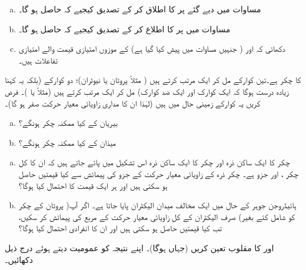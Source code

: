 \begin{enumerate}[a.]
\item
مساوات  میں دیے گئے  پر  کا اطلاق کر کے تصدیق کیجیے
 کہ  حاصل ہو گا۔
\item
مساوات  میں  پر  کا اطلاع کر کے تصدیق کیجیے کہ  حاصل ہو گا۔
\item
دکھائی کہ  اور  ( جنہیں مساوات  میں پیش کیا گیا ہے)  کے موزوں امتیازی قیمت والے امتیازی تفاعلات ہیں۔ 
\end{enumerate}
 کا چکر  ہے۔تین کوارکے مل کر ایک  مرتب کرتے ہیں ( مثلاً پروٹان یا نیوٹران)؛ دو کوارکے (بلکہ یہ کہنا زیادہ درست ہوگا کہ ایک کوارک اور ایک ضد کوارک) مل کر ایک  مرتب کرتے ہیں (مثلاً  یا )۔ فرض کریں یہ کوارکے زمینی حال میں ہیں (لہٰذا ان کا مداری زاویائی معیار حرکت صفر ہو گا)۔ 
\begin{enumerate}[a.]
\item
بیریان کے کیا ممکنہ چکر ہونگے؟ 
\item
میذان کے کیا ممکنہ چکر ہونگے؟ 
\end{enumerate}
\begin{enumerate}[a.]
\item
چکر  کا ایک ساکن ذرہ اور چکر  کا ایک ساکن ذرہ اس تشکیل میں پائے جاتے ہیں کہ ان کا کل چکر ، اور  جزو  ہے۔ چکر  ذرہ کے زاویائی معیار حرکت کے  جزو کی پیمائش سے کیا قیمتیں حاصل ہو سکتی ہیں اور ہر ایک قیمت کا احتمال کیا ہوگا؟ 
\item
ہائیڈروجن جوہر کے حال  میں ایک مخالف میدان الیکٹران پایا جاتا ہے۔ اگر آپ( پروٹان کے چکر کو شامل کئے بغیر) صرف الیکٹران کے کل زاویائی معیار حرکت کے مربع کی پیمائش کر سکیں، تب کیا قیمتیں حاصل ہو سکتی ہیں اور ان کا انفرادی احتمال کیا ہوگا؟ 
\end{enumerate}
 اور  کا مقلوب تعین کریں (جہاں  ہوگا)۔ اپنے نتیجہ کو عمومیت دیتے ہوئے درج ذیل دکھائیں۔ 
